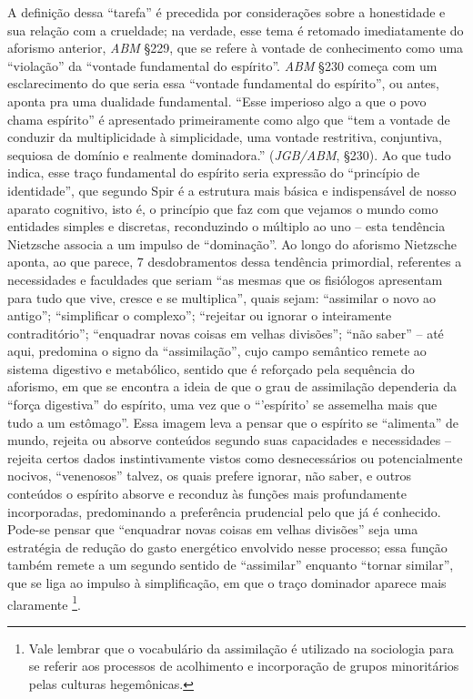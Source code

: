 \documentclass[
	12pt,				%
	openright,			%
	oneside,			%
	a4paper,			%
	english,			%
	french,				%
	spanish,			%
	brazil				%
	]{abntex2}
\begin{document}
	A definição dessa “tarefa” é precedida por considerações sobre a honestidade e sua relação com a crueldade; na verdade, esse tema é retomado imediatamente do aforismo anterior, \textit{ABM} §229, que se refere à vontade de conhecimento como uma “violação” da “vontade fundamental do espírito”. \textit{ABM} §230 começa com um esclarecimento do que seria essa “vontade fundamental do espírito”, ou antes, aponta pra uma dualidade fundamental. “Esse imperioso algo a que o povo chama espírito” é apresentado primeiramente como algo que “tem a vontade de conduzir da multiplicidade à simplicidade, uma vontade restritiva, conjuntiva, sequiosa de domínio e realmente dominadora.” (\textit{JGB/ABM}, §230). Ao que tudo indica, esse traço fundamental do espírito seria expressão do “princípio de identidade”, que segundo Spir é a estrutura mais básica e indispensável de nosso aparato cognitivo, isto é, o princípio que faz com que vejamos o mundo como entidades simples e discretas, reconduzindo o múltiplo ao uno – esta tendência Nietzsche associa a um impulso de “dominação”. Ao longo do aforismo Nietzsche aponta, ao que parece, 7 desdobramentos dessa tendência primordial, referentes a necessidades e faculdades que seriam “as mesmas que os fisiólogos apresentam para tudo que vive, cresce e se multiplica”, quais sejam: “assimilar o novo ao antigo”; “simplificar o complexo”; “rejeitar ou ignorar  o inteiramente contraditório”; “enquadrar novas coisas em velhas divisões”; “não saber” – até aqui, predomina o signo da “assimilação”, cujo campo semântico remete ao sistema digestivo e metabólico, sentido que é reforçado pela sequência do aforismo, em que se encontra a ideia de que o grau de assimilação dependeria da “força digestiva” do espírito, uma vez que o “'espírito' se assemelha mais que tudo a um estômago”. Essa imagem leva a pensar que o espírito se “alimenta” de mundo, rejeita ou absorve conteúdos segundo suas capacidades e necessidades – rejeita certos dados instintivamente vistos como desnecessários ou potencialmente nocivos, “venenosos” talvez, os quais prefere ignorar, não saber, e outros conteúdos o espírito absorve e reconduz às funções mais profundamente incorporadas, predominando a preferência prudencial pelo que já é conhecido. Pode-se pensar que “enquadrar novas coisas em velhas divisões” seja uma estratégia de redução do gasto energético envolvido nesse processo; essa função também remete a um segundo sentido de “assimilar” enquanto “tornar similar”, que se liga ao impulso à simplificação, em que o traço dominador aparece mais claramente
\footnote{Vale lembrar que o vocabulário da assimilação é utilizado na sociologia para se referir aos processos de acolhimento e incorporação de grupos minoritários pelas culturas hegemônicas. }.
\end{document}

